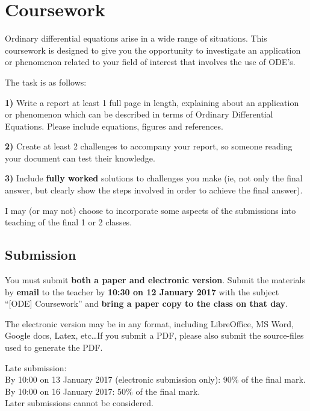 \newpage
\section{Coursework}
Ordinary differential equations arise in a wide range of situations. This coursework is designed to give you the opportunity to investigate an application or phenomenon related to your field of interest that involves the use of ODE's.

The task is as follows:

\textbf{1)} Write a report at least 1 full page in length, explaining about an application or phenomenon which can be described in terms of Ordinary Differential Equations. Please include equations, figures and references.

\textbf{2)} Create at least 2 challenges to accompany your report, so someone reading your document can test their knowledge.

\textbf{3)} Include \textbf{fully worked} solutions to challenges you make (ie, not only the final answer, but clearly show the steps involved in order to achieve the final answer).

I may (or may not) choose to incorporate some aspects of the submissions into teaching of the final 1 or 2 classes.

\subsection{Submission}
You must submit \textbf{both a paper and electronic version}. Submit the materials by \textbf{email} to the teacher by \textbf{10:30 on 12 January 2017} with the subject ``[ODE] Coursework'' and \textbf{bring a paper copy to the class on that day}.

The electronic version may be in any format, including LibreOffice, MS Word, Google docs, Latex, etc\ldots If you submit a PDF, please also submit the source-files used to generate the PDF.

Late submission:\\
By 10:00 on 13 January 2017 (electronic submission only): 90\% of the final mark.\\
By 10:00 on 16 January 2017: 50\% of the final mark.\\
Later submissions cannot be considered.

